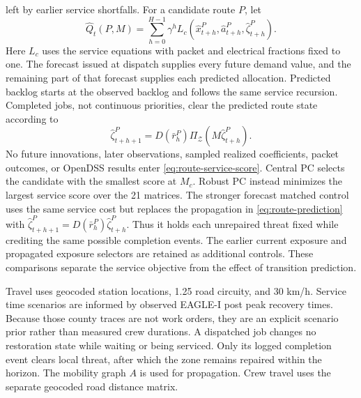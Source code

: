 \documentclass[journal]{IEEEtran}
\begin{document}
left by earlier service shortfalls.  For a candidate route $P$, let
\begin{equation}
\widehat Q_t(P,M)=\sum_{h=0}^{H-1}\gamma^h
L_c(\hat x_{t+h}^{P},\hat a_{t+h}^{P},\hat\zeta_{t+h}^{P}).
\label{eq:route-service-score}
\end{equation}
Here $L_c$ uses the service equations with packet and electrical fractions fixed
to one.  The forecast issued at dispatch supplies every future demand value,
and the remaining part of that forecast supplies each predicted allocation.
Predicted backlog starts at the observed backlog and follows the same service
recursion.  Completed jobs, not continuous priorities, clear the predicted
route state according to
\begin{equation}
\hat\zeta_{t+h+1}^{P}=D(\bar r_h^{P})\Pi_{\mathcal Z}(M\hat\zeta_{t+h}^{P}).
\label{eq:route-prediction}
\end{equation}
No future innovations, later observations, sampled realized coefficients,
packet outcomes, or OpenDSS results enter \eqref{eq:route-service-score}.
Central PC selects the candidate with the smallest score at $M_c$.
Robust PC instead minimizes the largest service score over the 21 matrices.
The stronger forecast matched control uses the same service cost but replaces
the propagation in \eqref{eq:route-prediction} with
$\hat\zeta_{t+h+1}^{P}=D(\bar r_h^{P})\hat\zeta_{t+h}^{P}$.
Thus it holds each unrepaired threat fixed while crediting the same possible
completion events.  The earlier current exposure and propagated exposure
selectors are retained as additional controls.  These comparisons separate the
service objective from the effect of transition prediction.



Travel uses geocoded station
locations, 1.25 road circuity, and 30 km/h.
Service time scenarios are informed by observed EAGLE-I post peak recovery
times.  Because those county traces are not work orders, they are an explicit
scenario prior rather than measured crew durations.  A dispatched job changes
no restoration state while waiting or being serviced.  Only its logged
completion event clears local threat, after which the zone remains repaired
within the horizon.  The mobility graph $A$ is used for propagation.  Crew
travel uses the separate geocoded road distance matrix.
\end{document}
